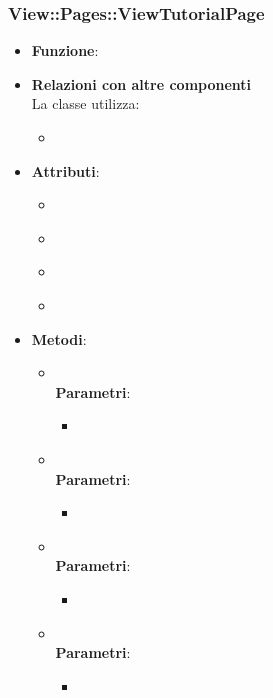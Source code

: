 \subsubsection{View::Pages::ViewTutorialPage}
\begin{itemize}
\item\textbf{Funzione}:
\item\textbf{Relazioni con altre componenti}\\
La classe utilizza:
	\begin{itemize}
		\item
	\end{itemize}
\item\textbf{Attributi}:
	\begin{itemize}
		\item\code{}\\
		\item\code{}\\
		\item\code{}\\
		\item\code{}\\
	\end{itemize}
\item\textbf{Metodi}:
	\begin{itemize}
		\item\code{}\\
		\textbf{Parametri}:
			\begin{itemize}
				\item\code{}\\
			\end{itemize}
		\item\code{}\\
		\textbf{Parametri}:
			\begin{itemize}
				\item\code{}\\
			\end{itemize}
		\item\code{}\\
		\textbf{Parametri}:
			\begin{itemize}
				\item\code{}\\
			\end{itemize}
		\item\code{}\\
		\textbf{Parametri}:
			\begin{itemize}
				\item\code{}\\
			\end{itemize}
	\end{itemize}
\end{itemize}

